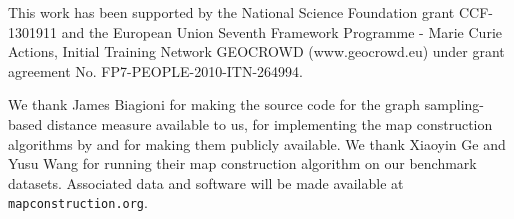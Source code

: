 \documentclass[natbib]{svjour3}                    \smartqed  \usepackage[table]{xcolor}
\begin{document}
\begin{acknowledgements}
This work has been supported by the National Science Foundation grant CCF-1301911 and the European Union Seventh Framework Programme - Marie Curie Actions, Initial Training Network GEOCROWD (www.geocrowd.eu) under grant agreement No. FP7-PEOPLE-2010-ITN-264994.


We thank James Biagioni for making the source code for the graph sampling-based distance measure \cite{be-irmgp-12} available to us, for implementing the map construction algorithms by \cite{Cao:2009:GTR:1653771.1653776,Davies:2006:SDR:1175887.1176088, edelkamp:2003:rpmi, Biagioni:2012:MIF:2424321.2424333} and for making them publicly available.
We thank Xiaoyin Ge and Yusu Wang for running their map construction algorithm \cite{DBLP:conf/nips/GeSBW11} on our benchmark datasets.
Associated data and software will be made available at {\tt mapconstruction.org}.
\end{acknowledgements}

       
\end{document}

